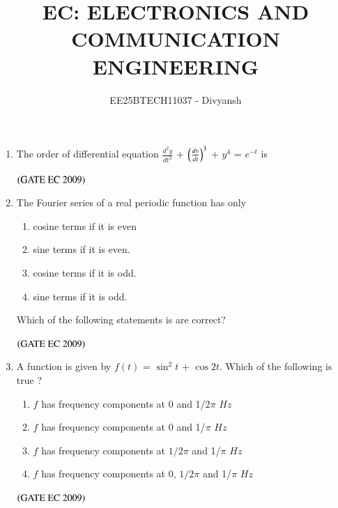 \documentclass[journal,12pt,onecolumn]{IEEEtran}
\title{EC: ELECTRONICS AND COMMUNICATION ENGINEERING}
\author{EE25BTECH11037 - Divyansh}
\theoremstyle{remark}
\begin{document}
\maketitle

\begin{enumerate}

\item The order of differential equation  $\frac{d^2y}{dt^2}$ + $\brak{\frac{dy}{dt}}^3$ + $y^4$ = $e^{-t}$ is
\begin{enumerate}
\end{enumerate}
\hfill $\brak{\text{GATE EC 2009}}$

\item The Fourier series of a real periodic function has only 
\begin{enumerate}
\item cosine terms if it is even
\item sine terms if it is even. 
\item cosine terms if it is odd.
\item sine terms if it is odd.
\end{enumerate}
Which of the following statements is are correct?
\begin{enumerate}
\end{enumerate}
\hfill $\brak{\text{GATE EC 2009}}$

\item A function is given by $f(t)$ = $\sin^2t$ + $\cos2t$. Which of the following is true ?

\begin{enumerate}
    \item $f$ has frequency components at $0$ and 1/2$\pi$  $Hz $
    \item $f$ has frequency components at $0$ and 1/$\pi$  $Hz $
    \item $f$ has frequency components at $1/2$$\pi$ and 1/$\pi$ $  Hz$ 
    \item $f$ has frequency components at $0$, $1/2$$\pi$ and 1/$\pi$ $ Hz$ 
\end{enumerate}
\hfill $\brak{\text{GATE EC 2009}}$


\end{enumerate}
\end{document}

